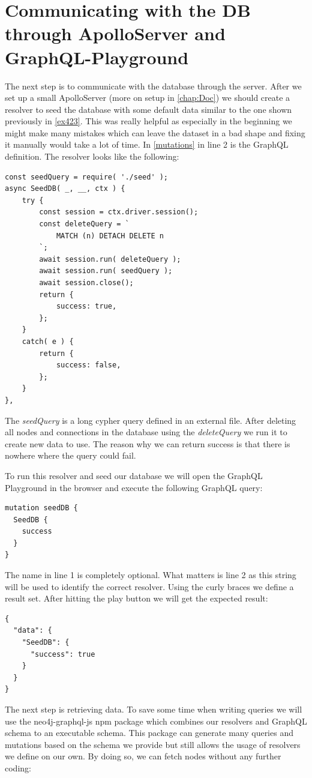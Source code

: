 \section{Communicating with the DB through ApolloServer and GraphQL-Playground}
The next step is to communicate with the database through the server. After we set up a small ApolloServer (more on setup in \autoref{chap:Doc}) we should create a resolver to seed the database with some default data similar to the one shown previously in \autoref{ex423}. This was really helpful as especially in the beginning we might make many mistakes which can leave the dataset in a bad shape and fixing it manually would take a lot of time. In \autoref{mutations} in line 2 is the GraphQL definition. The resolver looks like the following:
\begin{lstlisting}
const seedQuery = require( './seed' );
async SeedDB( _, __, ctx ) {
	try {
		const session = ctx.driver.session();
		const deleteQuery = `
			MATCH (n) DETACH DELETE n
		`;
		await session.run( deleteQuery );
		await session.run( seedQuery );
		await session.close();
		return {
			success: true,
		};
	}
	catch( e ) {
		return {
			success: false,
		};	
	}
},
\end{lstlisting}

The \emph{seedQuery} is a long cypher query defined in an external file. After deleting all nodes and connections in the database using the \emph{deleteQuery} we run it to create new data to use. The reason why we can return success is that there is nowhere where the query could fail.

To run this resolver and seed our database we will open the GraphQL Playground in the browser and execute the following GraphQL query:
\begin{lstlisting}[caption={Seeding the DB through GraphQL Playground}, label={exSeed}]
mutation seedDB {
  SeedDB {
    success
  }
}
\end{lstlisting}
The name in line 1 is completely optional. What matters is line 2 as this string will be used to identify the correct resolver. Using the curly braces we define a result set. After hitting the play button we will get the expected result:
\begin{lstlisting}[caption={Seeding Result}, label={exResSeed}]
{
  "data": {
    "SeedDB": {
      "success": true
    }
  }
}
\end{lstlisting}

The next step is retrieving data. To save some time when writing queries we will use the neo4j-graphql-js npm package which combines our resolvers and GraphQL schema to an executable schema. This package can generate many queries and mutations based on the schema we provide but still allows the usage of resolvers we define on our own.
By doing so, we can fetch nodes without any further coding:

